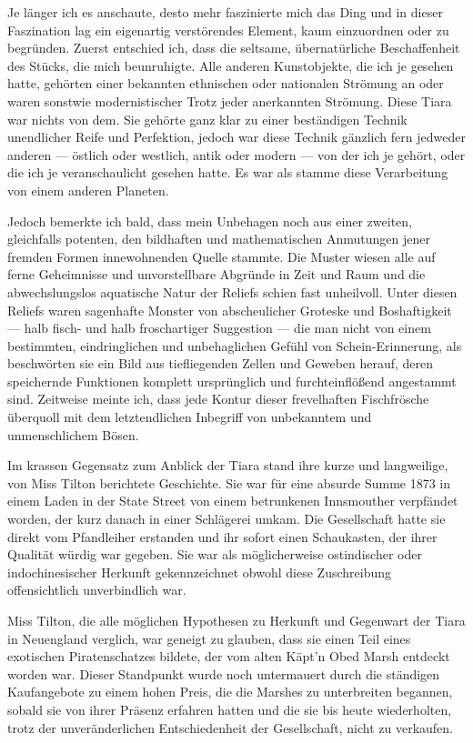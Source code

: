 Je länger ich es anschaute, desto mehr faszinierte mich das Ding und in dieser Faszination lag ein eigenartig verstörendes Element, kaum einzuordnen oder zu begründen. Zuerst entschied ich, dass die seltsame, übernatürliche Beschaffenheit des Stücks, die mich beunruhigte. Alle anderen Kunstobjekte, die ich je gesehen hatte, gehörten einer bekannten ethnischen oder nationalen Strömung an oder waren sonstwie modernistischer Trotz jeder anerkannten Strömung. Diese Tiara war nichts von dem. Sie gehörte ganz klar zu einer beständigen Technik unendlicher Reife und Perfektion, jedoch war diese Technik gänzlich fern jedweder anderen --- östlich oder westlich, antik oder modern --- von der ich je gehört, oder die ich je veranschaulicht gesehen hatte. Es war als stamme diese Verarbeitung von einem anderen Planeten.

Jedoch bemerkte ich bald, dass mein Unbehagen noch aus einer zweiten, gleichfalls potenten, den bildhaften und mathematischen Anmutungen jener fremden Formen innewohnenden Quelle stammte. Die Muster wiesen alle auf ferne Geheimnisse und unvorstellbare Abgründe in Zeit und Raum und die abwechslungslos aquatische Natur der Reliefs schien fast unheilvoll. Unter diesen Reliefs waren sagenhafte Monster von abscheulicher Groteske und Boshaftigkeit --- halb fisch- und halb froschartiger Suggestion --- die man nicht von einem bestimmten, eindringlichen und unbehaglichen Gefühl von Schein-Erinnerung, als beschwörten sie ein Bild aus tiefliegenden Zellen und Geweben herauf, deren speichernde Funktionen komplett ursprünglich und furchteinflößend angestammt sind. Zeitweise meinte ich, dass jede Kontur dieser frevelhaften Fischfrösche überquoll mit dem letztendlichen Inbegriff von unbekanntem und unmenschlichem Bösen.

Im krassen Gegensatz zum Anblick der Tiara stand ihre kurze und langweilige, von Miss Tilton berichtete Geschichte. Sie war für eine absurde Summe 1873 in einem Laden in der State Street von einem betrunkenen Innsmouther verpfändet worden, der kurz danach in einer Schlägerei umkam. Die Gesellschaft hatte sie direkt vom Pfandleiher erstanden und ihr sofort einen Schaukasten, der ihrer Qualität würdig war gegeben. Sie war als möglicherweise ostindischer oder indochinesischer Herkunft gekennzeichnet obwohl diese Zuschreibung offensichtlich unverbindlich war.

Miss Tilton, die alle möglichen Hypothesen zu Herkunft und Gegenwart der Tiara in Neuengland verglich, war geneigt zu glauben, dass sie einen Teil eines exotischen Piratenschatzes bildete, der vom alten Käpt'n Obed Marsh entdeckt worden war. Dieser Standpunkt wurde noch untermauert durch die ständigen Kaufangebote zu einem hohen Preis, die die Marshes zu unterbreiten begannen, sobald sie von ihrer Präsenz erfahren hatten und die sie bis heute wiederholten, trotz der unveränderlichen Entschiedenheit der Gesellschaft, nicht zu verkaufen.


